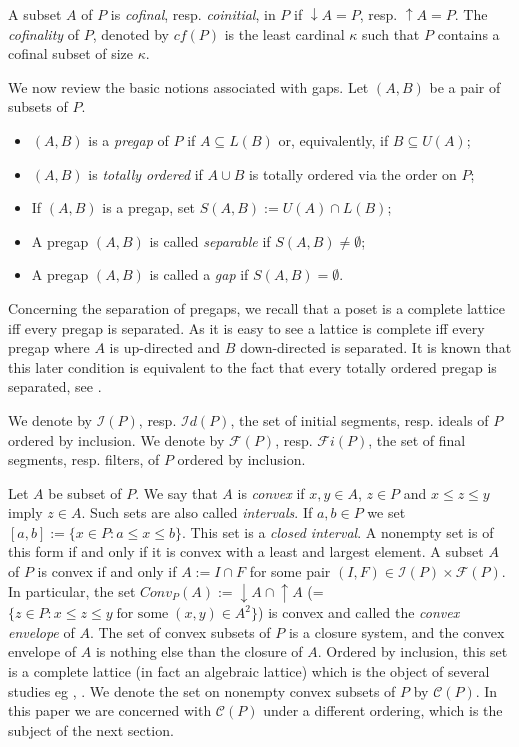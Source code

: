 \documentclass[12pt]{amsart}
\begin{document}
A subset $A$ of $P$ is \emph{cofinal}, resp. \emph{coinitial}, in $P$
if ${\downarrow \!\!} A=P$, resp. ${\uparrow \!\!} A=P$. The \emph{cofinality} of
$P$, denoted by $cf(P)$ is the least cardinal $\kappa$ such that $P$
contains a cofinal subset of size $\kappa$.

We now review the basic notions associated with gaps. Let $(A,B)$ be a
pair of subsets of $P$.

\begin{itemize} 
   \item $(A,B)$ is a  \emph{pregap} of $P$ if $A\subseteq L(B)$
  or, equivalently, if $B\subseteq U(A)$;
  \item $(A, B)$ is \emph{totally ordered} if $A\cup B$ is totally ordered via the order on $P$;  
  \item If $(A, B)$ is a pregap, set $S(A,B):=U(A)\cap L(B)$;
  \item A pregap $(A,B)$ is called \emph{separable} if $S(A,B)\ne \emptyset$;
  \item A pregap $(A,B)$ is called a \emph{gap} if $S(A, B) = \emptyset$.
  \end{itemize}
  
Concerning the separation of pregaps, we recall that a poset is a
complete lattice iff every pregap is separated.  As it is easy to see
a lattice is complete iff every pregap where $A$ is up-directed and
$B$ down-directed is separated.  It is known that this later condition
is equivalent to the fact that every totally ordered pregap is
separated, see \cite{D-R}.
  
We denote by $ \mathcal{I}(P)$, resp. $\mathcal {I}d (P)$, the set of
initial segments, resp. ideals of $P$ ordered by inclusion. We denote
by $\mathcal {F}(P)$, resp. $\mathcal {F}i(P)$, the set of final
segments, resp. filters, of $P$ ordered by inclusion.

Let $A$ be subset of $P$.  We say that $A$ is \emph{convex} if $x,
y\in A$, $z\in P$ and $x\leq z\leq y$ imply $z\in A$. Such sets are
also called \emph{intervals}. If $a, b\in P$ we set $[a, b]:= \{x\in
P: a\leq x\leq b\}$. This set is a \emph{closed interval}. A nonempty
set is of this form if and only if it is convex with a least and
largest element. A subset $A$ of $P$ is convex if and only if $A:=
I\cap F$ for some pair $(I,F)\in \mathcal{I}(P)\times \mathcal
{F}(P)$.  In particular, the set $Conv_P(A):={\downarrow \!\!}  A\cap 
{\uparrow \!\!} A$ (=$\{z\in P: x\leq z\leq y\; \text{for some}\; (x,y)\in A^2\}$) is
convex and called the \emph{convex envelope} of $A$.  The set
 of convex subsets of $P$ is a closure system, and
the convex envelope of $A$ is nothing else than the closure of
$A$. Ordered by inclusion, this set  is a complete lattice (in
fact an algebraic lattice) which is the object of several studies eg
\cite{birkhoff}, \cite{semenova}. 
We denote the set on nonempty convex subsets of $P$  by $\mathcal{C}(P)$.
In this paper we are concerned with $\mathcal{C}(P)$ under a different ordering, which is the subject
of the next section.
\end{document}
